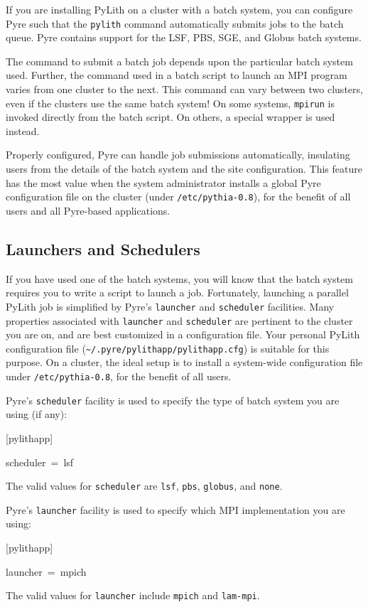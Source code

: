 If you are installing PyLith on a cluster with a batch system, you
can configure Pyre such that the \texttt{pylith} command automatically
submits jobs to the batch queue. Pyre contains support for the LSF,
PBS, SGE, and Globus batch systems.

The command to submit a batch job depends upon the particular batch
system used. Further, the command used in a batch script to launch
an MPI program varies from one cluster to the next. This command can
vary between two clusters, even if the clusters use the same batch
system! On some systems, \texttt{mpirun} is invoked directly from
the batch script. On others, a special wrapper is used instead.

Properly configured, Pyre can handle job submissions automatically,
insulating users from the details of the batch system and the site
configuration. This feature has the most value when the system administrator
installs a global Pyre configuration file on the cluster (under \texttt{/etc/pythia-0.8}),
for the benefit of all users and all Pyre-based applications.


\subsection{\label{sub:Launchers-and-Schedulers}Launchers and Schedulers}

If you have used one of the batch systems, you will know that the
batch system requires you to write a script to launch a job. Fortunately,
launching a parallel PyLith job is simplified by Pyre's \texttt{launcher}
and \texttt{scheduler} facilities. Many properties associated with
\texttt{launcher} and \texttt{scheduler} are pertinent to the cluster
you are on, and are best customized in a configuration file. Your
personal PyLith configuration file (\texttt{\textasciitilde{}/.pyre/pylithapp/pylithapp.cfg})
is suitable for this purpose. On a cluster, the ideal setup is to
install a system-wide configuration file under \texttt{/etc/pythia-0.8},
for the benefit of all users.

Pyre's \texttt{scheduler} facility is used to specify the type of
batch system you are using (if any):
\begin{lyxcode}
{[}pylithapp{]}

scheduler~=~lsf
\end{lyxcode}
The valid values for \texttt{scheduler} are \texttt{lsf}, \texttt{pbs},
\texttt{globus}, and \texttt{none}.

Pyre's \texttt{launcher} facility is used to specify which MPI implementation
you are using:
\begin{lyxcode}
{[}pylithapp{]}

launcher~=~mpich
\end{lyxcode}
The valid values for \texttt{launcher} include \texttt{mpich} and
\texttt{lam-mpi}.

